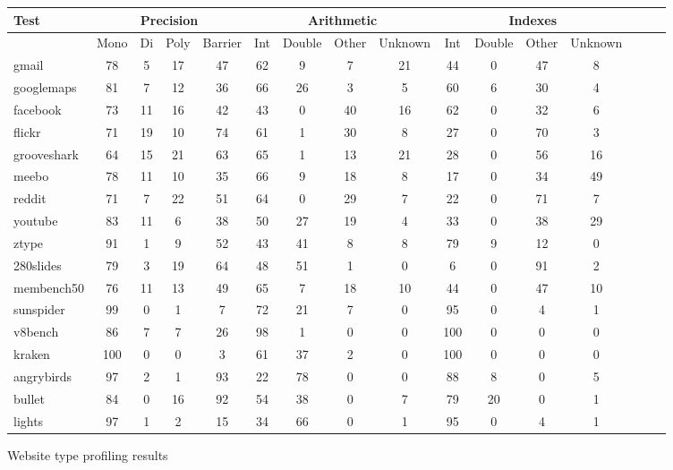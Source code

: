 \begin{figure*}
\begin{center}
\begin{tabular}{|l|ccc|c|cccc|cccc|ccc|}
\hline
Test
& \multicolumn{4}{|c|}{Precision}
& \multicolumn{4}{|c|}{Arithmetic}
& \multicolumn{4}{|c|}{Indexes} \\
\hline
& Mono & Di & Poly & Barrier
& Int & Double & Other & Unknown
& Int & Double & Other & Unknown \\
\hline
gmail          & 78 & 5  & 17 & 47 & 62 & 9  & 7  & 21 & 44 & 0 & 47 & 8 \\
googlemaps     & 81 & 7  & 12 & 36 & 66 & 26 & 3  & 5  & 60 & 6 & 30 & 4 \\
facebook       & 73 & 11 & 16 & 42 & 43 & 0 & 40 & 16 & 62 & 0 & 32 & 6 \\
flickr         & 71 & 19 & 10 & 74 & 61 & 1 & 30 & 8 & 27 & 0 & 70 & 3 \\
grooveshark    & 64 & 15 & 21 & 63 & 65 & 1 & 13 & 21 & 28 & 0 & 56 & 16 \\
meebo          & 78 & 11 & 10 & 35 & 66 & 9 & 18 & 8 & 17 & 0 & 34 & 49 \\
reddit         & 71 & 7 & 22 & 51 & 64 & 0 & 29 & 7 & 22 & 0 & 71 & 7 \\
youtube        & 83 & 11 & 6 & 38 & 50 & 27 & 19 & 4 & 33 & 0 & 38 & 29 \\
ztype          & 91 & 1 & 9 & 52 & 43 & 41 & 8 & 8 & 79 & 9 & 12 & 0 \\
280slides      & 79 & 3 & 19 & 64 & 48 & 51 & 1 & 0 & 6 & 0 & 91 & 2 \\
membench50     & 76 & 11 & 13 & 49 & 65 & 7  & 18 & 10 & 44 & 0 & 47 & 10 \\
sunspider      & 99 & 0  & 1  & 7  & 72 & 21 & 7  & 0  & 95 & 0 & 4  & 1  \\
v8bench        & 86 & 7  & 7  & 26 & 98 & 1  & 0  & 0  & 100 & 0 & 0 & 0  \\
kraken         & 100 & 0 & 0  & 3  & 61 & 37 & 2  & 0  & 100 & 0 & 0 & 0  \\
angrybirds     & 97 & 2 & 1 & 93 & 22 & 78 & 0 & 0 & 88 & 8 & 0 & 5 \\
bullet         & 84 & 0 & 16 & 92 & 54 & 38 & 0 & 7 & 79 & 20 & 0 & 1 \\
lights         & 97 & 1 & 2 & 15 & 34 & 66 & 0 & 1 & 95 & 0 & 4 & 1 \\
\hline
\end{tabular}
\end{center}
\caption{Website type profiling results}
\end{figure*}

